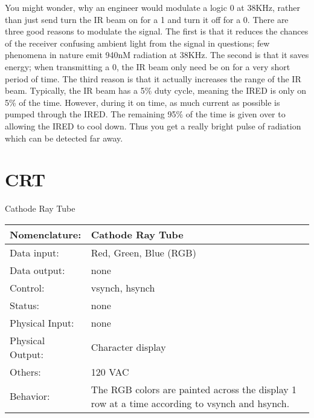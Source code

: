 You might wonder, why an engineer would modulate a logic 0 at 38KHz, rather than
just send turn the IR beam on for a 1 and turn it off for a 0.  There are three
good reasons to modulate the signal.  The first is that 
it reduces the chances of the receiver confusing ambient light from the
signal in questions; few phenomena in nature emit 940nM radiation at 38KHz. The 
second is that it saves energy; when transmitting a 0, the IR beam only need be
on for a very short period of time.  The third reason is that it actually 
increases the range of the IR beam.  Typically, the IR beam has a 5\% duty cycle,
meaning the IRED is only on 5\% of the time.  However, during it on time, 
as much current as possible is pumped through the IRED.  The remaining 95\% of
the time is given over to allowing the IRED to cool down.  Thus you get a really
bright pulse of radiation which can be detected far away.





\section{CRT}
\label{page:crt}
\begin{buildingblock}{Cathode Ray Tube}
\begin{tabular}{|l|p{3.5in}|} \hline
Nomenclature:  & Cathode Ray Tube  \\ \hline
Data input:    & Red, Green, Blue (RGB)   \\ \hline
Data output:   & none     \\ \hline
Control:       & vsynch, hsynch     \\ \hline
Status:        & none      \\ \hline
Physical Input:& none		\\ \hline
Physical Output:& Character display	\\ \hline
Others:        & 120 VAC     \\ \hline
Behavior:      & The RGB colors are painted across the display 1 row 
at a time according to vsynch and hsynch. \\ \hline
\end{tabular}
\end{buildingblock}

